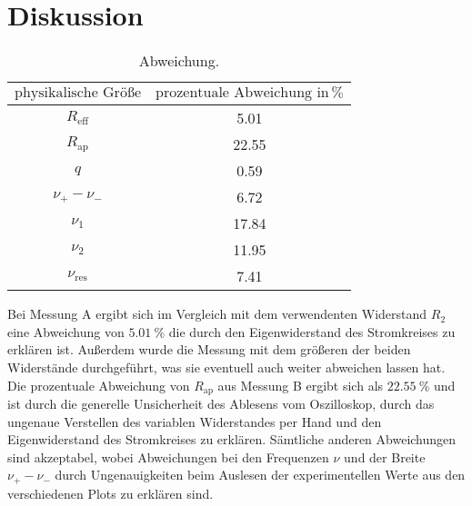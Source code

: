\section{Diskussion}
\label{sec:Diskussion}

\begin{table}[h]
  \centering
  \label{tab:abw}
  \begin{tabular}{ c c }
    \toprule
   $\text{physikalische Größe}$
   &{$\text{prozentuale Abweichung}\,\, \text{in} \, \si{\percent} $} \\

    \midrule
    $R_{\text{eff}}$ & 5.01 \\
    $R_{\text{ap}}$& 22.55  \\
    $q$ & 0.59 \\
    $\nu_{+}-\nu_{-}$ & 6.72 \\
    $\nu_{\text{1}}$ & 17.84\\
    $\nu_{\text{2}}$ & 11.95 \\
    $\nu_{\text{res}}$ & 7.41\\
    \bottomrule
  \end{tabular}
  \caption{Abweichung.}
\end{table}

Bei Messung A ergibt sich im Vergleich mit dem verwendenten Widerstand $R_{\text{2}}$
eine Abweichung von $\SI{5.01}{\percent}$ die durch den Eigenwiderstand des Stromkreises zu erklären ist.
Außerdem wurde die Messung mit dem größeren der beiden Widerstände durchgeführt, was sie
eventuell auch weiter abweichen lassen hat.
Die prozentuale Abweichung von $R_{\text{ap}}$ aus Messung B ergibt sich als
$\SI{22.55}{\percent}$ und ist durch die generelle Unsicherheit des Ablesens vom
Oszilloskop, durch das ungenaue Verstellen des variablen Widerstandes per Hand
und den Eigenwiderstand des Stromkreises zu erklären.
Sämtliche anderen Abweichungen sind akzeptabel, wobei Abweichungen bei den Frequenzen
$\nu$ und der Breite $\nu_{+}-\nu_{-}$ durch Ungenauigkeiten beim Auslesen der
experimentellen Werte aus den verschiedenen Plots zu erklären sind.
